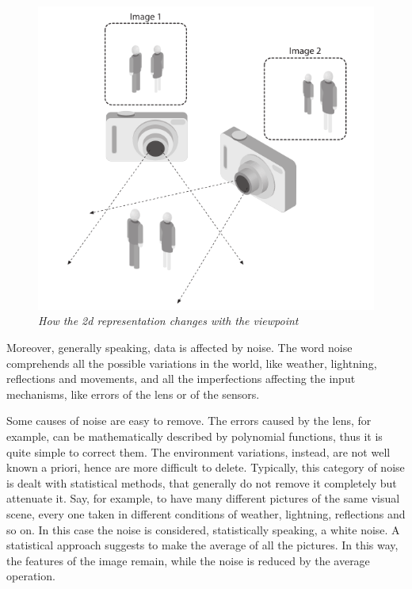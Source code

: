 	\begin{figure}[h]
	  \begin{center} 
	    \includegraphics[scale=0.6]{images/ch_01/2d_3d.png}
	  \end{center} 
	  \caption{\textit{How the 2d representation changes with the viewpoint}}  
	  \label{fig:2d3d}
	\end{figure}

	Moreover, generally speaking, data is affected by noise. The word noise comprehends all the possible variations in the world, like weather, lightning, reflections and movements, and all the imperfections affecting the input mechanisms, like errors of the lens or of the sensors. 
	
	Some causes of noise are easy to remove. The errors caused by the lens, for example, can be mathematically described by polynomial functions, thus it is quite simple to correct them. 
	The environment variations, instead, are not well known a priori, hence are more difficult to delete. Typically, this category of noise is dealt with statistical methods, that generally do not remove it completely but attenuate it. Say, for example, to have many different pictures of the same visual scene, every one taken in different conditions of weather, lightning, reflections and so on. In this case the noise is considered, statistically speaking, a white noise. A statistical approach suggests to make the average of all the pictures. In this way, the features of the image remain, while the noise is reduced by the average operation.
	
